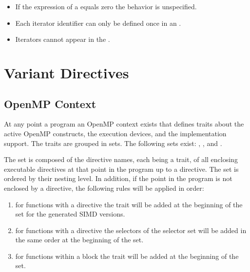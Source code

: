\restrictions

\begin{itemize}
\item If the  expression of a  equals zero the behavior is unspecified.
\item Each iterator identifier can only be defined once in an .
\item Iterators cannot appear in the .
\end{itemize}

\section{Variant Directives}
\label{sec:Variant Directives}

\subsection{OpenMP Context}
\label{subsec:OpenMP Context}

At any point a program an OpenMP context exists that defines traits about the active OpenMP constructs, the execution devices, and the implementation support. The traits are grouped in sets. The following sets exist: , ,  and .

The  set is composed of the directive names, each being a trait, of all enclosing executable directives at that point in the program up to a  directive. The set is ordered by their nesting level. In addition, if the point in the program is not enclosed by a  directive, the following rules will be applied in order:
\begin{enumerate} 
 \item for functions with a  directive the  trait will be added at the beginning of the set for the generated SIMD versions.  
 \item for functions with a  directive the selectors of the  selector set will be added in the same order at the beginning of the set.
 \item for functions within a  block the  trait will be added at the beginning of the set.
\end{enumerate}

